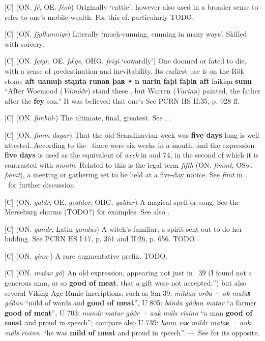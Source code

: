 \begin{itemize}
[C] (ON. \emph{fé}, OE. \emph{féoh})
  Originally ‘cattle’, however also used in a broader sense to refer to one’s mobile wealth. For this cf. particularly \Havamal TODO.

[C] (ON. \emph{fjǫlkunnigr})
  Literally ‘much-cunning, cunning in many ways’. Skilled with sorcery.

[C] (ON. \emph{fęigr}, OE. \emph{fǽge}, OHG. \emph{feigi} ‘cowardly’)
  One doomed or fated to die, with a sense of predestination and inevitability. Its earliest use is on the Rök stone: \textbf{aft uamuþ stąnta runaʀ þaʀ ᛭ n uarin faþi faþiʀ aft} faikiąn \textbf{sunu} “After Woemood (\emph{Vámóðr}) stand these , but Warren (\emph{Varinn}) painted, the father after the \textbf{fey} son.” It was believed that one’s See PCRN HS II:35, p. 928 ff.

[C] (ON. \emph{fimbul-})
  The ultimate, final, greatest. See , .

[C] (ON. \emph{fimm dagar})
  That the old Scandinavian week was \textbf{five days} long is well attested. According to the \Gulatingslog\ there were six weeks in a month, and the expression \textbf{five days} is used as the equivalent of \emph{week} in  and 74, in the second of which it is contrasted with \emph{month}. Related to this is the legal term \emph{fifth} (ON. \emph{fimmt}, OSw. \emph{fæmt}), a meeting or gathering set to be held at a five-day notice. See \emph{fimt} in \CV, \LMNL\ for further discussion.

[C] (ON. \emph{galdr}, OE. \emph{gealdor}, OHG. \emph{galdar})
  A magical spell or song. See the Merseburg charms (TODO?) for examples. See also .

[C] (ON. \emph{gandr}, Latin \emph{gandus})
  A witch’s familiar, a spirit sent out to do her bidding. See PCRN HS I:17, p. 361 and II:26, p. 656. TODO

[C] (ON. \emph{ginn-})
  A rare augmentative prefix. TODO.

[C] (ON. \emph{matar gó})
   An old expression, appearing not just in \Havamal\ 39 (I found not a generous man, or so \textbf{good of meat}, that a gift were not accepted;”) but also several Viking Age Runic inscriptions, such as Sm 39: \emph{mildan orða · ok mataʀ góðan} “mild of words and \textbf{good of meat}”, U 805: \emph{bónda góðan matar} “a farmer \textbf{good of meat}”, U 703: \emph{mandr matar góðr · auk máls risinn} “a man \textbf{good of meat} and proud in speech”; compare also U 739: \emph{hann vaʀ mildr mataʀ · auk máls risinn} “he was \textbf{mild of meat} and proud in speech”. — See  for its opposite.


\end{itemize}

